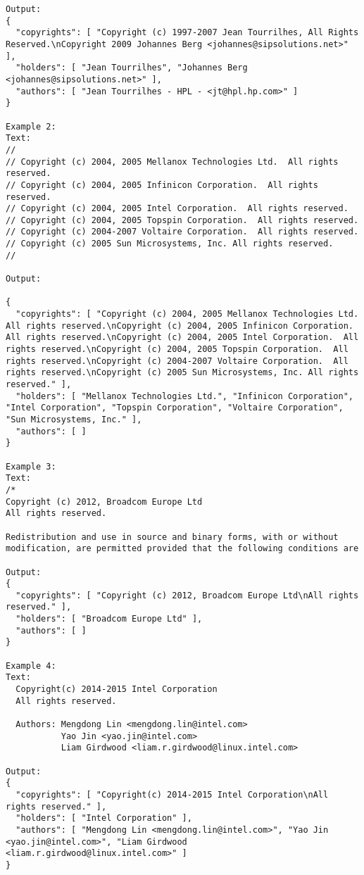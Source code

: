 \begin{lstlisting}[keepspaces=true]
Output:
{
  "copyrights": [ "Copyright (c) 1997-2007 Jean Tourrilhes, All Rights Reserved.\nCopyright	2009 Johannes Berg <johannes@sipsolutions.net>" ],
  "holders": [ "Jean Tourrilhes", "Johannes Berg <johannes@sipsolutions.net>" ],
  "authors": [ "Jean Tourrilhes - HPL - <jt@hpl.hp.com>" ]
}

Example 2:
Text:
//
// Copyright (c) 2004, 2005 Mellanox Technologies Ltd.  All rights reserved.
// Copyright (c) 2004, 2005 Infinicon Corporation.  All rights reserved.
// Copyright (c) 2004, 2005 Intel Corporation.  All rights reserved.
// Copyright (c) 2004, 2005 Topspin Corporation.  All rights reserved.
// Copyright (c) 2004-2007 Voltaire Corporation.  All rights reserved.
// Copyright (c) 2005 Sun Microsystems, Inc. All rights reserved.
//

Output:

{
  "copyrights": [ "Copyright (c) 2004, 2005 Mellanox Technologies Ltd.  All rights reserved.\nCopyright (c) 2004, 2005 Infinicon Corporation.  All rights reserved.\nCopyright (c) 2004, 2005 Intel Corporation.  All rights reserved.\nCopyright (c) 2004, 2005 Topspin Corporation.  All rights reserved.\nCopyright (c) 2004-2007 Voltaire Corporation.  All rights reserved.\nCopyright (c) 2005 Sun Microsystems, Inc. All rights reserved." ],
  "holders": [ "Mellanox Technologies Ltd.", "Infinicon Corporation", "Intel Corporation", "Topspin Corporation", "Voltaire Corporation", "Sun Microsystems, Inc." ],
  "authors": [ ]
}

Example 3:
Text:
/*
Copyright (c) 2012, Broadcom Europe Ltd
All rights reserved.

Redistribution and use in source and binary forms, with or without
modification, are permitted provided that the following conditions are

Output:
{
  "copyrights": [ "Copyright (c) 2012, Broadcom Europe Ltd\nAll rights reserved." ],
  "holders": [ "Broadcom Europe Ltd" ],
  "authors": [ ]
}

Example 4:
Text:
  Copyright(c) 2014-2015 Intel Corporation
  All rights reserved.

  Authors: Mengdong Lin <mengdong.lin@intel.com>
           Yao Jin <yao.jin@intel.com>
           Liam Girdwood <liam.r.girdwood@linux.intel.com>

Output:
{
  "copyrights": [ "Copyright(c) 2014-2015 Intel Corporation\nAll rights reserved." ],
  "holders": [ "Intel Corporation" ],
  "authors": [ "Mengdong Lin <mengdong.lin@intel.com>", "Yao Jin <yao.jin@intel.com>", "Liam Girdwood <liam.r.girdwood@linux.intel.com>" ]
}


\end{lstlisting}
